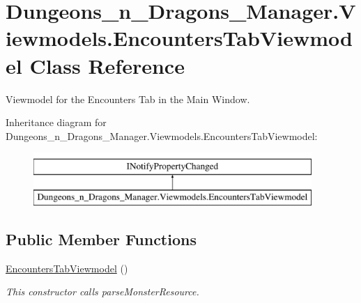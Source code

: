 \hypertarget{class_dungeons__n___dragons___manager_1_1_viewmodels_1_1_encounters_tab_viewmodel}{}\section{Dungeons\+\_\+n\+\_\+\+Dragons\+\_\+\+Manager.\+Viewmodels.\+Encounters\+Tab\+Viewmodel Class Reference}
\label{class_dungeons__n___dragons___manager_1_1_viewmodels_1_1_encounters_tab_viewmodel}


Viewmodel for the Encounters Tab in the Main Window.  


Inheritance diagram for Dungeons\+\_\+n\+\_\+\+Dragons\+\_\+\+Manager.\+Viewmodels.\+Encounters\+Tab\+Viewmodel\+:\begin{figure}[H]
\begin{center}
\leavevmode
\includegraphics[height=2.000000cm]{class_dungeons__n___dragons___manager_1_1_viewmodels_1_1_encounters_tab_viewmodel}
\end{center}
\end{figure}
\subsection*{Public Member Functions}
\begin{DoxyCompactItemize}
\item 
\mbox{\hyperlink{class_dungeons__n___dragons___manager_1_1_viewmodels_1_1_encounters_tab_viewmodel_a5aa53c0cac6c20d86a8acaba92ee56a7}{Encounters\+Tab\+Viewmodel}} ()
\begin{DoxyCompactList}\small\item\em This constructor calls parse\+Monster\+Resource. \end{DoxyCompactList}\end{DoxyCompactItemize}
